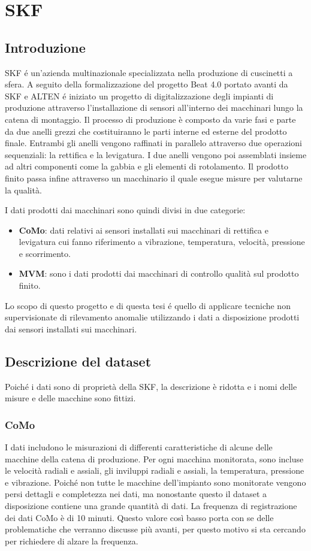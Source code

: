 \chapter{SKF}
\label{chap:skf}

\section{Introduzione}
SKF é un'azienda multinazionale specializzata nella produzione di cuscinetti a sfera. A seguito della formalizzazione del progetto Beat 4.0 portato avanti da SKF e ALTEN é iniziato un progetto di digitalizzazione degli impianti di produzione attraverso l'installazione di sensori all'interno dei macchinari lungo la catena di montaggio.
Il processo di produzione è composto da varie fasi e parte da due anelli grezzi che costituiranno le parti interne ed esterne del prodotto finale. Entrambi gli anelli vengono raffinati in parallelo attraverso due operazioni sequenziali: la rettifica e la levigatura. 
I due anelli vengono poi assemblati insieme ad altri componenti come la gabbia e gli elementi di rotolamento. Il prodotto finito passa infine attraverso un macchinario il quale esegue misure per valutarne la qualità. 

I dati prodotti dai macchinari sono quindi divisi in due categorie: 
\begin{itemize}
	\item \textbf{CoMo}: dati relativi ai sensori installati sui macchinari di rettifica e levigatura cui fanno riferimento a vibrazione, temperatura, velocità, pressione e scorrimento.
	\item \textbf{MVM}: sono i dati prodotti dai macchinari di controllo qualità sul prodotto finito.
\end{itemize}

Lo scopo di questo progetto e di questa tesi é quello di applicare tecniche non supervisionate di rilevamento anomalie utilizzando i dati a disposizione prodotti dai sensori installati sui macchinari.

\section{Descrizione del dataset}
Poiché i dati sono di proprietà della SKF, la descrizione è ridotta e i nomi delle misure e delle macchine sono fittizi.


\subsection{CoMo}
I dati includono le misurazioni di differenti caratteristiche di alcune delle macchine della catena di produzione. Per ogni macchina monitorata, sono incluse le velocità radiali e assiali, gli inviluppi radiali e assiali, la temperatura, pressione e vibrazione.
Poiché non tutte le macchine dell'impianto sono monitorate vengono persi dettagli e completezza nei dati, ma nonostante questo il dataset a disposizione contiene una grande quantità di dati.
La frequenza di registrazione dei dati CoMo è di 10 minuti. Questo valore così basso porta con se delle problematiche che verranno discusse più avanti, per questo motivo si sta cercando per richiedere di alzare la frequenza.

